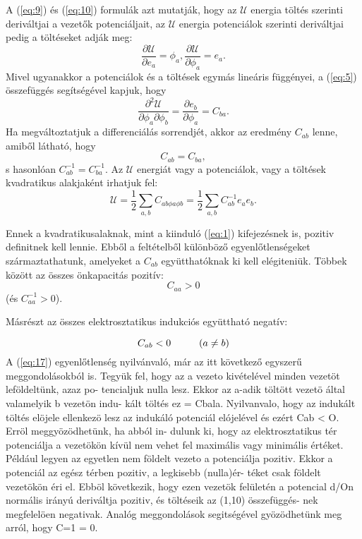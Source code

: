 \documentclass{article}
\begin{document}
A (\ref{eq:9}) és (\ref{eq:10}) formulák azt mutatják, hogy az $\mathcal{U}$ energia töltés szerinti deriváltjai a vezetők potenciáljait, az $\mathcal{U}$ energia potenciálok szerinti deriváltjai pedig a töltéseket adják meg:
\begin{equation} \label{eq:12}
\frac{\partial \mathcal{U}}{\partial e_a} = \phi_a , \frac{\partial \mathcal{U}}{\partial \phi_a} = e_a .
\end{equation}
Mivel ugyanakkor a potenciálok és a töltések egymás lineáris függényei, a (\ref{eq:5}) összefüggés segítségével kapjuk, hogy
\begin{equation} \label{eq:13}
\frac{\partial^2 \mathcal{U}}{\partial \phi_a \partial \phi_b} = \frac{\partial e_b}{\partial \phi_a} = C_{ba}.
\end{equation}
Ha megváltoztatjuk a differenciálás sorrendjét, akkor az eredmény $C_{ab}$ lenne, amiből látható, hogy
\begin{equation} \label{eq:14}
C_{ab} = C_{ba},
\end{equation}
s hasonlóan $C^{-1}_{ab}=C^{-1}_{ba}$. Az $\mathcal{U}$ energiát vagy a potenciálok, vagy a töltések kvadratikus alakjaként irhatjuk fel:
\begin{equation} \label{eq:15}
\mathcal{U} = \frac{1}{2} \sum\limits_{a, b} C_{ab \phi a \phi b} = \frac{1}{2} \sum\limits_{a, b} C^{-1}_{ab} e_a e_b .
\end{equation}

Ennek a kvadratikusalaknak, mint a kiinduló (\ref{eq:1}) kifejezésnek is, pozitiv definitnek kell lennie. Ebből a feltételből különböző egyenlőtlenségeket származtathatunk, amelyeket a $C_{ab}$ együtthatóknak ki kell elégiteniük. Többek között az összes önkapacitás pozitív:
\begin{equation} \label{eq:16}
C_{aa} > 0
\end{equation}
(és $C^{-1}_{aa} > 0$).

Másrészt az összes elektrosztatikus indukciós együttható negatív:

\begin{equation} \label{eq:17}
C_{ab} < 0 \hspace{1 cm} (a \neq b )
\end{equation}
A (\ref{eq:17}) egyenlőtlenség nyilvánvaló, már az itt következő egyszerű meggondolásokból is. Tegyük fel, hogy az a vezeto kivételével minden vezetöt leföldeltünk, azaz po- tencialjuk nulla lesz. Ekkor az a-adik töltött vezetö által valamelyik b vezetön indu-
kált töltés ez = Cbala. Nyilvanvalo, hogy az indukált töltés elöjele ellenkezö lesz az indukáló potenciál elójelével és ezért Cab < O. Erröl meggyözödhetünk, ha abból in- dulunk ki, hogy az elektrosztatikus tér potenciálja a vezetökön kívül nem vehet fel maximális vagy minimális értéket. Például legyen az egyetlen nem földelt vezeto a potenciálja pozitiv. Ekkor a potenciál az egész térben pozitiv, a legkisebb (nulla)ér- téket csak földelt vezetökön éri el. Ebböl következik, hogy ezen vezetök felületén a potencial d/On normális irányú deriváltja pozitiv, és töltéseik az (1,10) összefüggés- nek megfelelöen negativak. Analóg meggondolások segitségével gyözödhetünk meg arról, hogy C=1 = 0.
\end{document}
